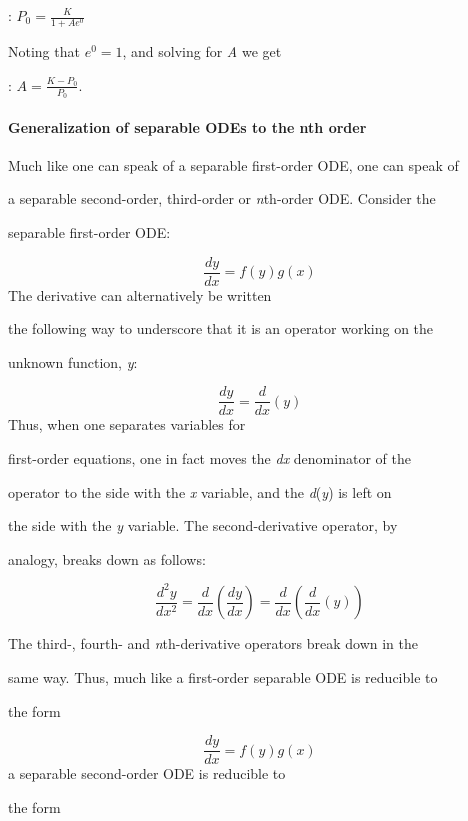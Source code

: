 :   $P_0=\frac{K}{1+Ae^0}$



Noting that $e^0=1$, and solving for \textit{A} we get



:   $A=\frac{K-P_0}{P_0}.$



\paragraph{Generalization of separable ODEs to the nth order}



Much like one can speak of a separable first-order ODE, one can speak of

a separable second-order, third-order or \textit{n}th-order ODE. Consider the

separable first-order ODE:



$$\frac{dy}{dx}=f(y)g(x)$$ The derivative can alternatively be written

the following way to underscore that it is an operator working on the

unknown function, \textit{y}:



$$\frac{dy}{dx}=\frac{d}{dx}(y)$$ Thus, when one separates variables for

first-order equations, one in fact moves the \textit{dx} denominator of the

operator to the side with the \textit{x} variable, and the \textit{d}(\textit{y}) is left on

the side with the \textit{y} variable. The second-derivative operator, by

analogy, breaks down as follows:



$$\frac{d^2y}{dx^2} = \frac{d}{dx}\left(\frac{dy}{dx}\right) = \frac{d}{dx}\left(\frac{d}{dx}(y)\right)$$

The third-, fourth- and \textit{n}th-derivative operators break down in the

same way. Thus, much like a first-order separable ODE is reducible to

the form



$$\frac{dy}{dx}=f(y)g(x)$$ a separable second-order ODE is reducible to

the form



